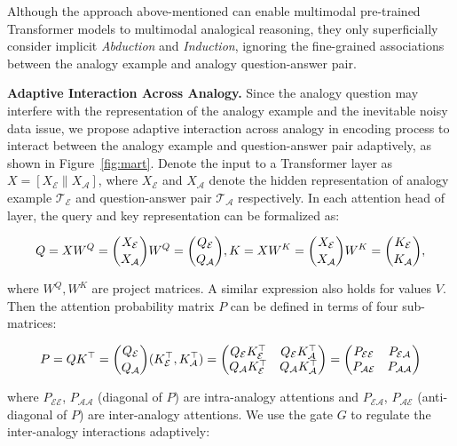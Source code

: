 \documentclass{article} \usepackage{iclr2023_conference,times}
\begin{document}
Although the approach above-mentioned can enable multimodal pre-trained Transformer models to multimodal analogical reasoning, they only superficially consider implicit \textit{Abduction} and  \textit{Induction}, ignoring the fine-grained associations between the analogy example and analogy question-answer pair.


\textbf{Adaptive Interaction Across Analogy.}
Since the analogy question may interfere with the representation of the analogy example and the inevitable noisy data issue, we propose adaptive interaction across analogy in encoding process to interact between the analogy example and question-answer pair adaptively, as shown in Figure~\ref{fig:mart}.
Denote the input to a Transformer layer as $X=[X_\mathcal{E} \parallel X_\mathcal{A}]$, where $X_\mathcal{E}$ and  $X_\mathcal{A}$
 denote the hidden representation of analogy example $\mathcal{T_E}$ and question-answer pair $\mathcal{T_A}$ respectively. 
In each attention head of layer, the query and key representation can be formalized as:
\begin{small}
\begin{equation}
    Q=XW^Q=\dbinom{X_\mathcal{E}}{ X_\mathcal{A}}W^Q=\dbinom{Q_\mathcal{E}}{Q_\mathcal{A}}, K=XW^K=\dbinom{X_\mathcal{E}}{ X_\mathcal{A}}W^K=\dbinom{K_\mathcal{E}}{K_\mathcal{A}},
\end{equation}
\end{small}where $W^Q, W^K$ are project matrices. 
A similar expression also holds for values $V$.
Then the attention probability matrix $P$ can be defined in terms of four sub-matrices:
\begin{small}
\begin{equation}
    P=QK^\top = \dbinom{Q_\mathcal{E}}{Q_\mathcal{A}}(K_\mathcal{E}^\top, K_\mathcal{A}^\top)=
    \begin{pmatrix}
        Q_\mathcal{E}K_\mathcal{E}^\top & Q_\mathcal{E}K_\mathcal{A}^\top \\
        Q_\mathcal{A}K_\mathcal{E}^\top & Q_\mathcal{A}K_\mathcal{A}^\top
    \end{pmatrix}
    =
    \begin{pmatrix}
        P_\mathcal{EE} & P_\mathcal{EA} \\
        P_\mathcal{AE} & P_\mathcal{AA}
    \end{pmatrix}
\end{equation}
\end{small}where $P_\mathcal{EE}$, $P_\mathcal{AA}$ (diagonal of $P$) are intra-analogy attentions and $P_\mathcal{EA}$, $P_\mathcal{AE}$ (anti-diagonal of $P$) are inter-analogy attentions. We use the gate $G$ to regulate the inter-analogy interactions adaptively:
\end{document}
